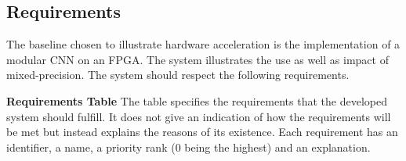 \subsection{Requirements}

The baseline chosen to illustrate hardware acceleration is the implementation of a modular CNN on an FPGA. The system illustrates the use as well as impact of mixed-precision. The system should respect the following requirements.

\textbf{Requirements Table} The table specifies the requirements that the developed system should fulfill. It does not give an indication of how the requirements will be met but instead explains the reasons of its existence. Each requirement has an identifier, a name, a priority rank (0 being the highest) and an explanation.


